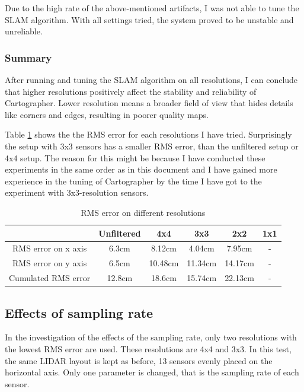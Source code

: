 Due to the high rate of the above-mentioned artifacts, I was not able to tune the SLAM algorithm. With all
settings tried, the system proved to be unstable and unreliable.





\subsubsection{Summary}
After running and tuning the SLAM algorithm on all resolutions, I can conclude that higher resolutions
positively affect the stability and reliability of Cartographer. Lower resolution means a broader field of
view that hides details like corners and edges, resulting in poorer quality maps.

Table \ref{tab:error_on_different_resolutions} shows the the RMS error for each resolutions I have tried.
Surprisingly the setup with 3x3 sensors has a smaller RMS error, than the unfiltered setup or 4x4 setup.
The reason for this might be because I have conducted these experiments in the same order as in this document
and I have gained more experience in the tuning of Cartographer by the time I have got to the experiment with 3x3-resolution
sensors.

\begin{table}[ht]
	\centering
	\begin{tabular}{||c c c c c c||}
		\hline
                            & Unfiltered    & 4x4     & 3x3     & 2x2     & 1x1 \\
		\hline\hline
        RMS error on x axis & 6.3cm         & 8.12cm  & 4.04cm  & 7.95cm  & -\\
        \hline
        RMS error on y axis & 6.5cm         & 10.48cm & 11.34cm & 14.17cm & -\\
		\hline
        Cumulated RMS error & 12.8cm        & 18.6cm  & 15.74cm & 22.13cm & -\\
		\hline
	\end{tabular}
	\caption{RMS error on different resolutions}
	\label{tab:error_on_different_resolutions}
\end{table}






\subsection{Effects of sampling rate}
In the investigation of the effects of the sampling rate, only two resolutions with the lowest RMS error
are used. These resolutions are 4x4 and 3x3. In this test, the same LIDAR layout is kept as before,
13 sensors evenly placed on the horizontal axis. Only one parameter is changed, that is the sampling
rate of each sensor.

